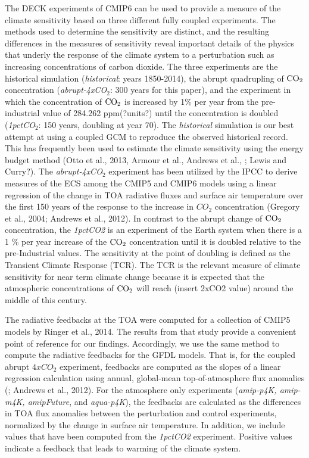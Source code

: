 \documentclass[draft]{agujournal2019}
\begin{document}
The DECK experiments of CMIP6 can be used to provide a measure of the climate sensitivity based on 
three different fully coupled experiments.  The methods used to determine the sensitivity are distinct, and the resulting 
differences in the measures of sensitivity reveal important details of the physics that underly the response
of the climate system to a perturbation such as increasing concentrations of carbon dioxide.  The three 
experiments are the historical simulation (\textit{historical}: years 1850-2014),  the abrupt quadrupling of 
$\rm{CO}_2$ concentration (\textit{abrupt-4xCO$_2$}: 300 years for this paper), and the experiment in 
which the concentration of $\rm{CO}_2$ is increased by 1\%  per year from the pre-industrial value of 
284.262 ppm(?units?) until the concentration is doubled  (\textit{1pctCO$_2$}: 150 years, doubling at year 70).  
The \textit{historical} simulation is our best attempt at using a coupled GCM to reproduce the 
observed historical record.  This has frequently been used to estimate the climate sensitivity using the 
energy budget method 
(Otto et al., 2013, Armour et al., Andrews et al., ; Lewis and Curry?).  
The \textit{abrupt-4xCO$_2$} experiment has been utilized by the IPCC to derive measures of the 
ECS among the CMIP5 and CMIP6 models using a linear regression of the change in TOA radiative fluxes 
and surface air temperature over the first 150 years of the response to the increase in $CO_2$ 
concentration (Gregory et al., 2004; Andrews et al., 2012).  In contrast to the abrupt change of 
$\rm{CO}_2$ concentration, the \textit{1pctCO2} is an experiment of the Earth system when 
there is a  1 \% per year increase of the $\rm{CO}_2$ concentration until it is doubled relative to the 
pre-Industrial values.  The sensitivity at the point of doubling is defined 
as the Transient Climate Response (TCR).  The TCR is the relevant measure of climate sensitivity for 
near term climate change because it is expected that the atmospheric concentrations of $\rm{CO}_2$ 
will reach (insert 2xCO2 value) around the middle of this century.         

The radiative feedbacks at the TOA were computed for a collection of CMIP5 models by Ringer et al., 2014.  
The results from that study provide a convenient point of reference for our findings.  
Accordingly, we use the same method to compute the radiative feedbacks for the GFDL models.  
That is, for the coupled abrupt $4xCO_{2}$ experiment, feedbacks are computed as  
the slopes of a linear regression calculation using annual, global-mean top-of-atmosphere flux anomalies 
(\cite{Gregory_etal_2004}; Andrews et al., 2012).  For the atmosphere only experiments 
(\textit{amip-p4K, amip-m4K, amipFuture}, and \textit{aqua-p4K}), the feedbacks are calculated as the 
differences in TOA flux anomalies between the perturbation and control experiments, normalized 
by the change in surface air temperature.  In addition, we include values that have been computed from the 
\textit{1pctCO2} experiment.   Positive values indicate a feedback that leads to warming of the climate system.   
\end{document}
